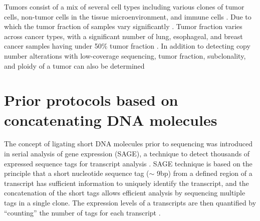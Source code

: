Tumors consist of a mix of several cell types including various clones
of tumor cells, non-tumor cells in the tissue microenvironment, and
immune cells \citep{witz2006tumor}.
%
Due to which the tumor fraction of samples vary significantly
\citep{carter2012absolute,van2010allele,oesper2013theta}. Tumor fraction
varies across cancer types, with a significant number of lung,
esophageal, and breast cancer samples having under 50\% tumor fraction
\citep{carter2012absolute}.
%
In addition to detecting copy number alterations with low-coverage
sequencing, tumor fraction, subclonality, and ploidy of a tumor can also
be determined \citep{adalsteinsson2017scalable,gusnanto2012correcting}



\section{Prior protocols based on concatenating DNA molecules}
The concept of ligating short DNA molecules prior
to sequencing was introduced in serial analysis of gene expression
(SAGE), a technique to detect thousands of expressed sequence
tags for transcript analysis \citep{velculescu1995serial}.
SAGE technique is based on the principle that a short nucleotide sequence
tag ($\sim$ 9bp) from a defined region of a transcript has sufficient
information to uniquely identify the transcript, and the concatenation
of the short tags allows efficient analysis by sequencing multiple tags
in a single clone. The expression levels of a transcripts are then
quantified by ``counting'' the number of tags for each transcript
\citep{velculescu1995serial}.
%

